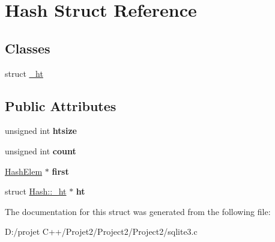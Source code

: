 \hypertarget{struct_hash}{}\section{Hash Struct Reference}
\label{struct_hash}
\subsection*{Classes}
\begin{DoxyCompactItemize}
\item 
struct \mbox{\hyperlink{struct_hash_1_1__ht}{\+\_\+ht}}
\end{DoxyCompactItemize}
\subsection*{Public Attributes}
\begin{DoxyCompactItemize}
\item 
\mbox{\label{struct_hash_a072258e24a38e09175f1308deb013bc8}} 
unsigned int {\bfseries htsize}
\item 
\mbox{\label{struct_hash_a7ab16f173cdc347ffbe39eaa85ee6fda}} 
unsigned int {\bfseries count}
\item 
\mbox{\label{struct_hash_a2cfc9936ca2a624c6492ab6557f4705b}} 
\mbox{\hyperlink{struct_hash_elem}{Hash\+Elem}} $\ast$ {\bfseries first}
\item 
\mbox{\label{struct_hash_ac0f36e03746a3fe69643db08d93bc0c4}} 
struct \mbox{\hyperlink{struct_hash_1_1__ht}{Hash\+::\+\_\+ht}} $\ast$ {\bfseries ht}
\end{DoxyCompactItemize}


The documentation for this struct was generated from the following file\+:\begin{DoxyCompactItemize}
\item 
D\+:/projet C++/\+Projet2/\+Project2/\+Project2/sqlite3.\+c\end{DoxyCompactItemize}
